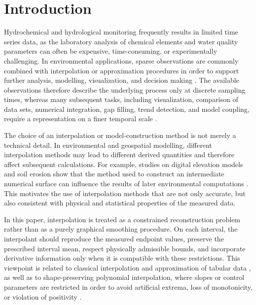 \documentclass[12pt,a4paper]{article}
\begin{document}
\section{Introduction}
Hydrochemical and hydrological monitoring frequently results in limited time series data, as the laboratory analysis of chemical elements and water quality parameters can often be expensive, time-consuming, or experimentally challenging. In environmental applications, sparse observations are commonly combined with interpolation or approximation procedures in order to support further analysis, modelling, visualization, and decision making \cite{gnauck2004waterquality,lepot2017interpolation,kokhan2013geoinformation}. The available observations therefore describe the underlying process only at discrete sampling times, whereas many subsequent tasks, including visualization, comparison of data sets, numerical integration, gap filling, trend detection, and model coupling, require a representation on a finer temporal scale \cite{gnauck2004waterquality,lepot2017interpolation}.

The choice of an interpolation or model-construction method is not merely a technical detail. In environmental and geospatial modelling, different interpolation methods may lead to different derived quantities and therefore affect subsequent calculations. For example, studies on digital elevation models and soil erosion show that the method used to construct an intermediate numerical surface can influence the results of later environmental computations \cite{piatkova2019dem}. This motivates the use of interpolation methods that are not only accurate, but also consistent with physical and statistical properties of the measured data.

In this paper, interpolation is treated as a constrained reconstruction problem rather than as a purely graphical smoothing procedure. On each interval, the interpolant should reproduce the measured endpoint values, preserve the prescribed interval mean, respect physically admissible bounds, and incorporate derivative information only when it is compatible with these restrictions. This viewpoint is related to classical interpolation and approximation of tabular data \cite{krylyk2013computational,deboor1978splines}, as well as to shape-preserving polynomial interpolation, where slopes or control parameters are restricted in order to avoid artificial extrema, loss of monotonicity, or violation of positivity \cite{fritsch1980monotone,fritsch1984monotone,scipyPchip}.
\end{document}
